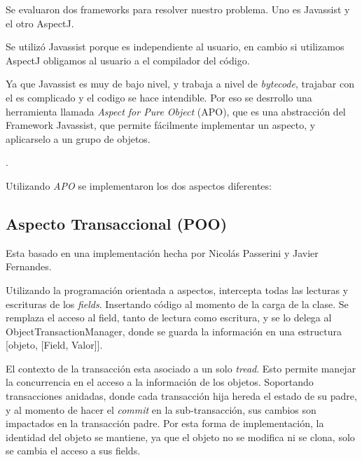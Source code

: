 \medskip  

Se evaluaron dos frameworks para resolver nuestro problema. Uno es Javassist y
el otro AspectJ. \cite{KiczalesHHKPG01}

\medskip 

Se utilizó Javassist porque es independiente al usuario, en cambio si utilizamos
AspectJ obligamos al usuario a el compilador del código. 

\medskip 

Ya que Javassist es muy de bajo nivel, y trabaja a nivel de \emph{bytecode},
trajabar con el es complicado y el codigo se hace intendible. Por eso se
desrrollo una herramienta llamada \emph{ Aspect for Pure Object} (APO), que es 
una abstracción del Framework Javassist, que permite fácilmente implementar un
aspecto, y aplicarselo a un grupo de objetos.

.

\medskip 

Utilizando \emph{APO} se implementaron los dos aspectos diferentes:

	\subsection{Aspecto Transaccional (POO)} 
		Esta basado en una implementación
		hecha por Nicolás Passerini y Javier Fernandes.
		 
		Utilizando la programación orientada a aspectos, intercepta todas las lecturas
		y escrituras de los \emph{fields}. Insertando código al momento de la carga de
		la clase.
		Se remplaza el acceso al field, tanto de lectura como escritura, y se lo delega
		al ObjectTransactionManager, donde se guarda la información en una estructura
		[objeto, [Field, Valor]].
		
		\medskip
		
		El contexto de la transacción esta asociado a un solo \emph{tread}. Esto
		permite manejar la concurrencia en el acceso a la información de los objetos. 
		Soportando transacciones anidadas, donde cada transacción hija hereda el estado
		de su padre, y al momento de hacer el \emph{commit} en la sub-transacción, sus
		cambios son impactados en la transacción padre.
		Por esta forma de implementación, la identidad del objeto se mantiene, ya que
		el objeto no se modifica ni se clona, solo se cambia el acceso a sus fields.
		
